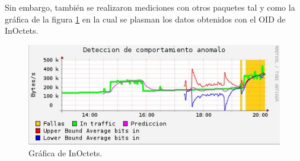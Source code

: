 Sin embargo, también se realizaron mediciones con otros paquetes tal y como la gráfica de la figura \ref{image:grafica3} en la cual se plasman los datos obtenidos con el OID de InOctets.
\FloatBarrier
\begin{figure}[htbp!]
		\centering
			\includegraphics[width=.7 \textwidth]{images/grafica3}
		\caption{Gráfica de InOctets.}
		\label{image:grafica3}
\end{figure}
\FloatBarrier

